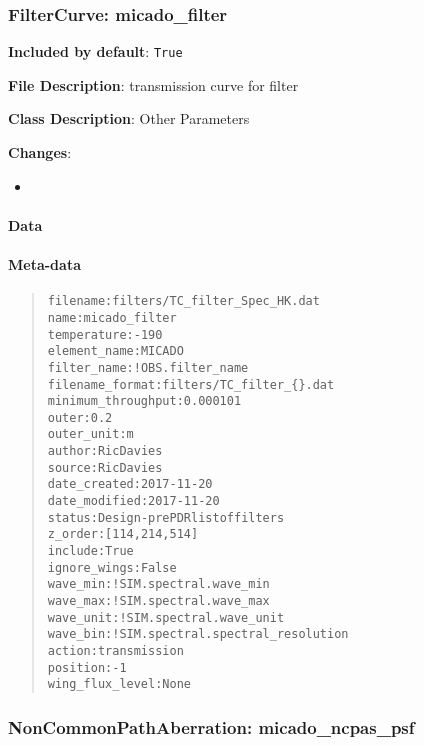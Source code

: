 \subsubsection{FilterCurve: \textquotedbl{}micado\_filter\textquotedbl{}%
  \label{filtercurve-micado-filter}%
}

\textbf{Included by default}: \texttt{True}

\textbf{File Description}: transmission curve for filter

\textbf{Class Description}: Other Parameters

\textbf{Changes}:

\begin{itemize}
\item \end{itemize}


\paragraph{Data%
  \label{id1}%
}


\paragraph{Meta-data%
  \label{id2}%
}

\begin{quote}
\begin{alltt}
          filename : filters/TC_filter_Spec_HK.dat
              name : micado_filter
       temperature : -190
      element_name : MICADO
       filter_name : !OBS.filter_name
   filename_format : filters/TC_filter_\{\}.dat
minimum_throughput : 0.000101
             outer : 0.2
        outer_unit : m
            author : Ric Davies
            source : Ric Davies
      date_created : 2017-11-20
     date_modified : 2017-11-20
            status : Design - pre PDR list of filters
           z_order : [114, 214, 514]
           include : True
      ignore_wings : False
          wave_min : !SIM.spectral.wave_min
          wave_max : !SIM.spectral.wave_max
         wave_unit : !SIM.spectral.wave_unit
          wave_bin : !SIM.spectral.spectral_resolution
            action : transmission
          position : -1
   wing_flux_level : None
\end{alltt}
\end{quote}


\subsubsection{NonCommonPathAberration: \textquotedbl{}micado\_ncpas\_psf\textquotedbl{}%
  \label{noncommonpathaberration-micado-ncpas-psf}%
}

